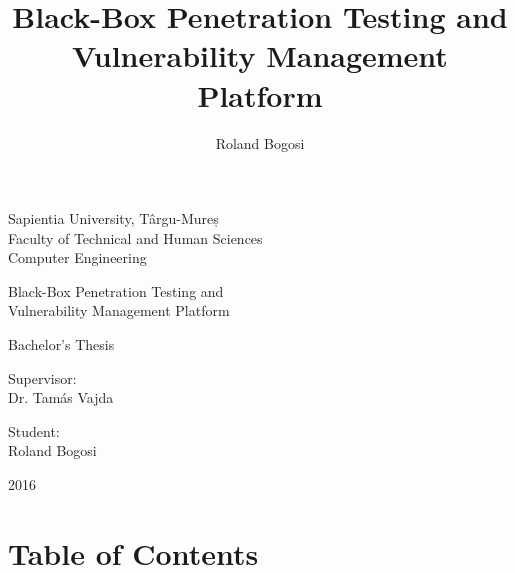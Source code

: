 \documentclass[a4paper,12pt]{article}
\author{Roland Bogosi}
\title{Black-Box Penetration Testing and Vulnerability Management Platform}
\begin{document}
\thispagestyle{empty}

	\begin{center}
		{\Large Sapientia University, Târgu-Mureș}\\\vspace{0.05in}
		{\Large Faculty of Technical and Human Sciences}\\\vspace{0.07in}
		{\Large Computer Engineering}\\
		
		\vspace{2.5in}
		
		{\huge Black-Box Penetration Testing and}\\\vspace{0.1in}
		{\huge Vulnerability Management Platform}
		
		\vspace{0.5in}
		
		{\LARGE Bachelor's Thesis}
		
	\end{center}
	
	\vspace{2.0in}
	
	\begin{multicols}{2}
		\begin{flushleft}
			{\Large Supervisor:}\\\vspace{0.05in}
			{\LARGE {Dr. Tamás Vajda}}
		\end{flushleft}
		\columnbreak
		\begin{flushright}
			{\Large Student:}\\\vspace{0.1in}
			{\LARGE {Roland Bogosi}}
		\end{flushright}
	\end{multicols}
	
	\vspace{1.5in}
		
	\begin{center}
		{\LARGE 2016}
	\end{center}

\newpage
\thispagestyle{empty}
\section*{Table of Contents}

	\begingroup
	\renewcommand{\section}[2]{}
	\hypersetup{linkcolor=blue}
	\setlength{\parskip}{0em}
	\tableofcontents
	\endgroup
\end{document}
